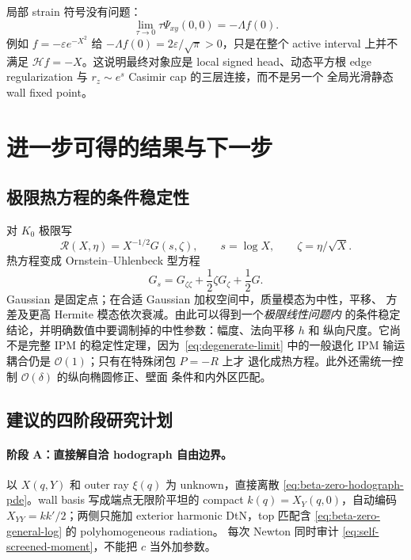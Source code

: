 \documentclass[11pt,a4paper,fontset=fandol]{ctexart}
\newcommand{\Order}{\mathcal O}
\begin{document}
局部 strain 符号没有问题：
\begin{equation}
 \lim_{\tau\to0}\tau\Psi_{xy}(0,0)=-\Lambda f(0).
 \label{eq:wall-strain-selection}
\end{equation}
例如 $f=-\varepsilon e^{-X^2}$ 给
$-\Lambda f(0)=2\varepsilon/\sqrt\pi>0$，只是在整个 active interval 上并不
满足 $\mathcal Hf=-X$。这说明最终对象应是 local signed head、动态平方根
edge regularization 与 $r_z\sim e^s$ Casimir cap 的三层连接，而不是另一个
全局光滑静态 wall fixed point。

\section{进一步可得的结果与下一步}

\subsection{极限热方程的条件稳定性}

对 $K_0$ 极限写
\begin{equation}
  \mathcal R(X,\eta)=X^{-1/2}G(s,\zeta),
  \qquad s=\log X,
  \qquad \zeta=\eta/\sqrt X.
\end{equation}
热方程变成 Ornstein--Uhlenbeck 型方程
\begin{equation}
  G_s=G_{\zeta\zeta}+\frac12\zeta G_\zeta+\frac12G.
  \label{eq:ou}
\end{equation}
Gaussian 是固定点；在合适 Gaussian 加权空间中，质量模态为中性，平移、
方差及更高 Hermite 模态依次衰减。由此可以得到一个\emph{极限线性问题内}
的条件稳定结论，并明确数值中要调制掉的中性参数：幅度、法向平移 $h$ 和
纵向尺度。它尚不是完整 IPM 的稳定性定理，因为~\eqref{eq:degenerate-limit}
中的一般退化 IPM 输运耦合仍是 $\Order(1)$；只有在特殊闭包 $P=-R$ 上才
退化成热方程。此外还需统一控制 $\Order(\delta)$ 的纵向椭圆修正、壁面
条件和内外区匹配。

\subsection{建议的四阶段研究计划}

\paragraph{阶段 A：直接解自洽 hodograph 自由边界。}
以 $X(q,Y)$ 和 outer ray $\xi(q)$ 为 unknown，直接离散
\eqref{eq:beta-zero-hodograph-pde}。wall basis 写成端点无限阶平坦的 compact
$k(q)=X_Y(q,0)$，自动编码 $X_{YY}=kk'/2$；两侧只施加 exterior harmonic
DtN，top 匹配含 \eqref{eq:beta-zero-general-log} 的 polyhomogeneous radiation。
每次 Newton 同时审计 \eqref{eq:self-screened-moment}，不能把 $c$ 当外加参数。
\end{document}
